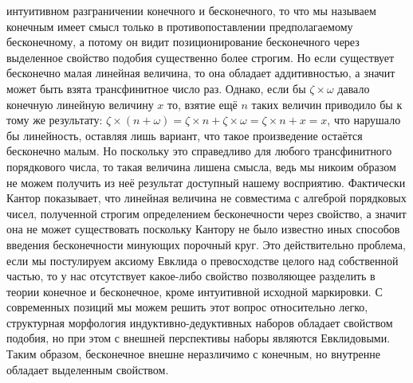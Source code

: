 \documentclass[12pt]{article}
\begin{document}
интуитивном разграничении конечного и бесконечного, то что мы называем конечным имеет смысл только в противопоставлении предполагаемому бесконечному, а потому он видит позиционирование бесконечного через выделенное свойство подобия существенно более строгим. Но если существует бесконечно малая линейная величина, то она обладает аддитивностью, а значит может быть взята трансфинитное число раз. Однако, если бы $\zeta \times \omega$ давало конечную линейную величину $x$ то, взятие ещё $n$ таких величин приводило бы к тому же результату: $\zeta \times (n + \omega) = \zeta \times n + \zeta \times \omega = \zeta \times n + x = x$, что нарушало бы линейность, оставляя лишь вариант, что такое произведение остаётся бесконечно малым. Но поскольку это справедливо для любого трансфинитного порядкового числа, то такая величина лишена смысла, ведь мы никоим образом не можем получить из неё результат доступный нашему восприятию. Фактически Кантор показывает, что линейная величина не совместима с алгеброй порядковых чисел, полученной строгим определением бесконечности через свойство, а значит она не может существовать поскольку Кантору не было известно иных способов введения бесконечности минующих порочный круг. Это действительно проблема, если мы постулируем аксиому Евклида о превосходстве целого над собственной частью, то у нас отсутствует какое-либо свойство позволяющее разделить в теории конечное и бесконечное, кроме интуитивной исходной маркировки. С современных позиций мы можем решить этот вопрос относительно легко, структурная морфология индуктивно-дедуктивных наборов обладает свойством подобия, но при этом с внешней перспективы наборы являются Евклидовыми. Таким образом, бесконечное внешне неразличимо с конечным, но внутренне обладает выделенным свойством.
\end{document}
